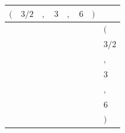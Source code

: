 {\scriptsize\setlength{\tabcolsep}{1.5pt}%
\begin{tabular}{ccccccc|l}
$($ & $3/2$ & $,$ & $3$ & $,$ & $6$ & $)$ & \\ \hline
\gcell{$$} & \gcell{$$} & \gcell{$$} & \gcell{$$} & \gcell{$$} & \gcell{$$} & \gcell{$$} & $($ \\
\gcell{$$} & \gcell{$\posD{\bullet}$} & \gcell{$$} & \gcell{$\posD{\bullet}$} & \gcell{$$} & \gcell{$\posC{\circ}$} & \gcell{$$} & $3/2$ \\
\gcell{$$} & \gcell{$$} & \gcell{$$} & \gcell{$$} & \gcell{$$} & \gcell{$$} & \gcell{$$} & $,$ \\
\gcell{$$} & \gcell{$\posD{\bullet}$} & \gcell{$$} & \gcell{$\posD{\bullet}$} & \gcell{$$} & \gcell{$\posD{\bullet}$} & \gcell{$$} & $3$ \\
\gcell{$$} & \gcell{$$} & \gcell{$$} & \gcell{$$} & \gcell{$$} & \gcell{$$} & \gcell{$$} & $,$ \\
\gcell{$$} & \gcell{$\posC{\circ}$} & \gcell{$$} & \gcell{$\posD{\bullet}$} & \gcell{$$} & \gcell{$\posD{\bullet}$} & \gcell{$$} & $6$ \\
\gcell{$$} & \gcell{$$} & \gcell{$$} & \gcell{$$} & \gcell{$$} & \gcell{$$} & \gcell{$$} & $)$ \\
\end{tabular}}
